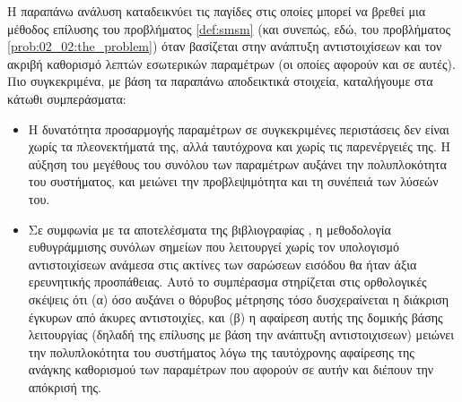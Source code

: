 Η παραπάνω ανάλυση καταδεικνύει τις παγίδες στις οποίες μπορεί να βρεθεί μια
μέθοδος επίλυσης του προβλήματος \ref{def:smsm} (και συνεπώς, εδώ, του
προβλήματος \ref{prob:02_02:the_problem}) όταν βασίζεται στην ανάπτυξη
αντιστοιχίσεων και τον ακριβή καθορισμό λεπτών εσωτερικών παραμέτρων (οι οποίες
αφορούν και σε αυτές). Πιο συγκεκριμένα, με βάση τα παραπάνω αποδεικτικά
στοιχεία, καταλήγουμε στα κάτωθι συμπεράσματα:

\begin{itemize}
  \item Η δυνατότητα προσαρμογής παραμέτρων σε συγκεκριμένες περιστάσεις δεν
        είναι χωρίς τα πλεονεκτήματά της, αλλά ταυτόχρονα και χωρίς τις
        παρενέργειές της. Η αύξηση του μεγέθους του συνόλου των παραμέτρων
        αυξάνει την πολυπλοκότητα του συστήματος, και μειώνει την προβλεψιμότητα
        και τη συνέπειά των λύσεών του.
  \item Σε συμφωνία με τα αποτελέσματα της βιβλιογραφίας
        \cite{Donoso2017b,bernreiter2021phaser}, η μεθοδολογία ευθυγράμμισης
        συνόλων σημείων που λειτουργεί χωρίς τον υπολογισμό αντιστοιχίσεων
        ανάμεσα στις ακτίνες των σαρώσεων εισόδου θα ήταν άξια ερευνητικής
        προσπάθειας. Αυτό το συμπέρασμα στηρίζεται στις ορθολογικές σκέψεις ότι
        (α) όσο αυξάνει ο θόρυβος μέτρησης τόσο δυσχεραίνεται η διάκριση
        έγκυρων από άκυρες αντιστοιχίες, και (β) η αφαίρεση αυτής της δομικής
        βάσης λειτουργίας (δηλαδή της επίλυσης με βάση την ανάπτυξη
        αντιστοιχισεων) μειώνει την πολυπλοκότητα του συστήματος λόγω της
        ταυτόχρονης αφαίρεσης της ανάγκης καθορισμού των παραμέτρων που αφορούν
        σε αυτήν και διέπουν την απόκρισή της.
\end{itemize}
